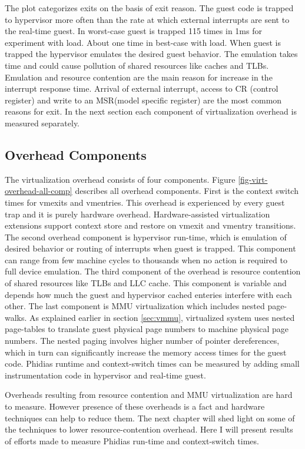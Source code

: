 The plot categorizes exits on the basis of exit reason. 
The guest code is trapped to hypervisor more often than the rate at which external interrupts are sent to the real-time guest.
In worst-case guest is trapped 115 times in 1ms for experiment with \mhackbench{} load. About one time in best-case with \mcachepressure{} load.
When guest is trapped the hypervisor emulates the desired guest behavior. The emulation takes time and could cause pollution of shared resources like caches and TLBs. Emulation and resource contention are the main reason for increase in the interrupt response time.
Arrival of external interrupt, access to CR (control register) and write to an MSR(model specific register) are the most common reasons for exit.
In the next section each component of virtualization overhead is measured separately.


\subsection{Overhead Components} \label{sec:overheadcomp}
The virtualization overhead consists of four components. 
Figure \ref{fig-virt-overhead-all-comp} describes all overhead components.
First is the context switch times for vmexits and vmentries.
This overhead is experienced by every guest trap and it is purely hardware overhead.
Hardware-assisted virtualization extensions support context store and restore on vmexit and vmentry transitions.
The second overhead component is hypervisor run-time, which is emulation of desired behavior or routing of interrupts when guest is trapped.
This component can range from few machine cycles to thousands when no action is required to full device emulation.
The third component of the overhead is resource contention of shared resources like TLBs and LLC cache.
This component is variable and depends how much the guest and hypervisor cached enteries interfere with each other.
The last component is MMU virtualization which includes nested page-walks. 
As explained earlier in section \ref{sec:vmmu}, virtualized system uses nested page-tables to translate 
guest physical page numbers to machine physical page numbers. The nested paging involves higher number of pointer dereferences, which in turn
can significantly increase the memory access times for the guest code.
Phidias runtime and context-switch times can be measured by adding small instrumentation code in hypervisor and real-time guest. 

Overheads resulting from resource contention and MMU virtualization are hard to measure.
However presence of these overheads is a fact and hardware techniques can help to reduce them.
The next chapter will shed light on some of the techniques to lower resource-contention overhead.
Here I will present results of efforts made to measure Phidias run-time and context-switch times.

